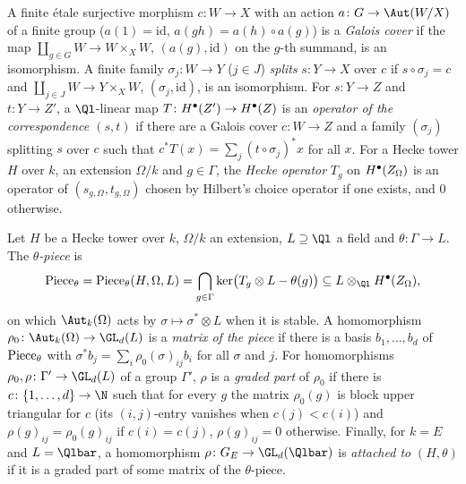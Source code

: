 \begin{definition}\label{def:pf:steps2:hop}
A finite \'etale surjective morphism $c\colon W\to X$ with an action $a\colon G\to\Aut(W/X)$ of a
finite group ($a(1)=\mathrm{id}$, $a(gh)=a(h)\circ a(g)$) is a \emph{Galois cover} if the map
$\coprod_{g\in G}W\to W\times_XW$, $(a(g),\mathrm{id})$ on the $g$-th summand, is an
isomorphism. A finite family $\sigma_j\colon W\to Y$ ($j\in J$) \emph{splits} $s\colon Y\to X$ over
$c$ if $s\circ\sigma_j=c$ and $\coprod_{j\in J}W\to Y\times_XW$, $(\sigma_j,\mathrm{id})$, is an
isomorphism. For $s\colon Y\to Z$ and $t\colon Y\to Z'$, a $\Ql$-linear map
$T\colon H^{\bullet}(Z')\to H^{\bullet}(Z)$ is an \emph{operator of the correspondence $(s,t)$} if there are
a Galois cover $c\colon W\to Z$ and a family $(\sigma_j)$ splitting $s$ over $c$ such that
$c^\ast T(x)=\sum_j(t\circ\sigma_j)^\ast x$ for all $x$. For a Hecke tower $H$ over $k$, an extension
$\Omega/k$ and $g\in\Gamma$, the \emph{Hecke operator} $T_g$ on $H^{\bullet}(Z_\Omega)$ is an operator
of $(s_{g,\Omega},t_{g,\Omega})$ chosen by Hilbert's choice operator if one exists, and $0$
otherwise.
\end{definition}

\begin{definition}\label{def:pf:steps2:piece}
Let $H$ be a Hecke tower over $k$, $\Omega/k$ an extension, $L\supseteq\Ql$ a field and
$\theta\colon\Gamma\to L$. The \emph{$\theta$-piece} is
\[
  \stepsiiPiece_\theta=\stepsiiPiece_\theta(H,\Omega,L)=\bigcap_{g\in\Gamma}\ker\bigl(T_g\otimes L-\theta(g)\bigr)
  \subseteq L\otimes_{\Ql}\stepsiiH(Z_\Omega),
\]
on which $\Aut_k(\Omega)$ acts by $\sigma\mapsto\sigma^\ast\otimes L$ when it is stable. A homomorphism
$\rho_0\colon\Aut_k(\Omega)\to\GL_d(L)$ is a \emph{matrix of the piece} if there is a basis
$b_1,\dots,b_d$ of $\mathrm{Piece}_\theta$ with $\sigma^\ast b_j=\sum_i\rho_0(\sigma)_{ij}b_i$ for all
$\sigma$ and $j$. For homomorphisms $\rho_0,\rho\colon\Gamma'\to\GL_d(L)$ of a group $\Gamma'$, $\rho$
is a \emph{graded part} of $\rho_0$ if there is $c\colon\{1,\dots,d\}\to\N$ such that for every $g$ the
matrix $\rho_0(g)$ is block upper triangular for $c$ (its $(i,j)$-entry vanishes when $c(j)<c(i)$)
and $\rho(g)_{ij}=\rho_0(g)_{ij}$ if $c(i)=c(j)$, $\rho(g)_{ij}=0$ otherwise. Finally, for $k=E$ and
$L=\Qlbar$, a homomorphism $\rho\colon G_E\to\GL_d(\Qlbar)$ is \emph{attached to} $(H,\theta)$ if it is
a graded part of some matrix of the $\theta$-piece.
\end{definition}

